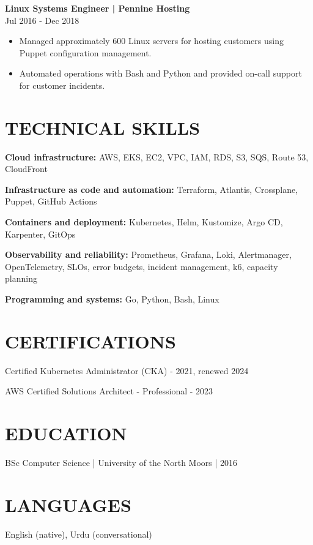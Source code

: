\documentclass[11pt,a4paper]{article}
\newcommand{\cvsection}[1]{\section*{#1}}
\newcommand{\cvrole}[2]{\needspace{5\baselineskip}\noindent\textbf{#1}\\#2\par}
\begin{document}
\cvrole{Linux Systems Engineer | Pennine Hosting}{Jul 2016 - Dec 2018}
\begin{itemize}
\item Managed approximately 600 Linux servers for hosting customers using Puppet configuration management.
\item Automated operations with Bash and Python and provided on-call support for customer incidents.
\end{itemize}
\cvsection{TECHNICAL SKILLS}
\textbf{Cloud infrastructure:} AWS, EKS, EC2, VPC, IAM, RDS, S3, SQS, Route 53, CloudFront\par
\textbf{Infrastructure as code and automation:} Terraform, Atlantis, Crossplane, Puppet, GitHub Actions\par
\textbf{Containers and deployment:} Kubernetes, Helm, Kustomize, Argo CD, Karpenter, GitOps\par
\textbf{Observability and reliability:} Prometheus, Grafana, Loki, Alertmanager, OpenTelemetry, SLOs, error budgets, incident management, k6, capacity planning\par
\textbf{Programming and systems:} Go, Python, Bash, Linux
\cvsection{CERTIFICATIONS}
Certified Kubernetes Administrator (CKA) - 2021, renewed 2024\par
AWS Certified Solutions Architect - Professional - 2023
\cvsection{EDUCATION}
BSc Computer Science | University of the North Moors | 2016
\cvsection{LANGUAGES}
English (native), Urdu (conversational)
\end{document}

